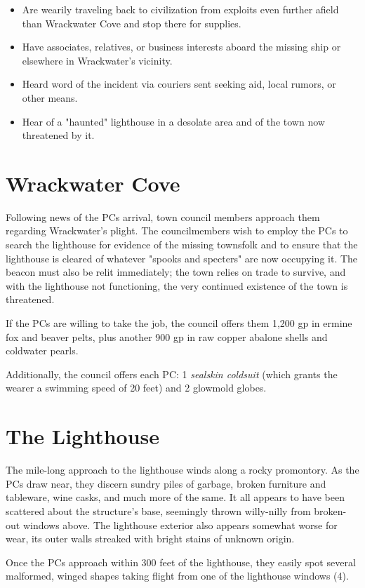 \documentclass[10pt,a4paper,twoside,bg=print,twocolumn,openany,nodeprecatedcode]{dndbook}
\begin{document}
\begin{itemize}
\item Are wearily traveling back to civilization from exploits even further afield than Wrackwater Cove and stop there for supplies.
\item Have associates, relatives, or business interests aboard the missing ship or elsewhere in Wrackwater's vicinity.
\item Heard word of the incident via couriers sent seeking aid, local rumors, or other means.
\item Hear of a "haunted" lighthouse in a desolate area and of the town now threatened by it.
\end{itemize}

\section{Wrackwater Cove}
Following news of the PCs arrival, town council members approach them regarding Wrackwater's plight. The councilmembers wish to employ the PCs to search the lighthouse for evidence of the missing townsfolk and to ensure that the lighthouse is cleared of whatever "spooks and specters" are now occupying it. The beacon must also be relit immediately; the town relies on trade to survive, and with the lighthouse not functioning, the very continued existence of the town is threatened.

If the PCs are willing to take the job, the council offers them 1,200 gp in ermine fox and beaver pelts, plus another 900 gp in raw copper abalone shells and coldwater pearls.

Additionally, the council offers each PC: 1 \textit{sealskin coldsuit} (which grants the wearer a swimming speed of 20 feet) and 2 glowmold globes.

\section{The Lighthouse}
The mile-long approach to the lighthouse winds along a rocky promontory. As the PCs draw near, they discern sundry piles of garbage, broken furniture and tableware, wine casks, and much more of the same. It all appears to have been scattered about the structure's base, seemingly thrown willy-nilly from broken-out windows above. The lighthouse exterior also appears somewhat worse for wear, its outer walls streaked with bright stains of unknown origin.

Once the PCs approach within 300 feet of the lighthouse, they easily spot several malformed, winged shapes taking flight from one of the lighthouse windows (4).
\end{document}
